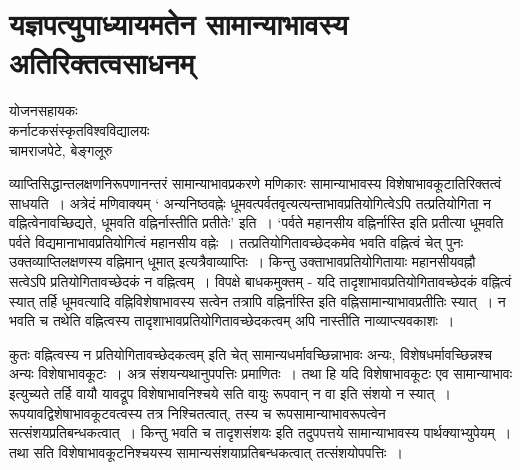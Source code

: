 {\fontsize{15}{17}\selectfont
\chapter{यज्ञपत्युपाध्यायमतेन सामान्याभावस्य अतिरिक्तत्वसाधनम्}

\begin{center}
\smallskip

योजनसहायकः\\
कर्नाटकसंस्कृतविश्वविद्यालयः\\
चामराजपेटे, बेङ्गलूरु
\addrule
\end{center}

व्याप्तिसिद्धान्तलक्षणनिरूपणानन्तरं सामान्याभावप्रकरणे मणिकारः  सामान्याभावस्य विशेषाभावकूटातिरिक्तत्वं साधयति~। अत्रेदं मणिवाक्यम् ‘ अन्यनिष्ठवह्नेः धूमवत्पर्वतवृत्यत्यन्ताभावप्रतियोगित्वेऽपि तत्प्रतियोगिता न वह्नित्वेनावच्छिद्यते, धूमवति वह्निर्नास्तीति प्रतीतेः’ इति~। ‘पर्वते महानसीय वह्निर्नास्ति इति प्रतीत्या धूमवति पर्वते विद्यमानाभावप्रतियोगित्वं महानसीय वह्नेः~। तत्प्रतियोगितावच्छेदकमेव भवति वह्नित्वं चेत् पुनः उक्तव्याप्तिलक्षणस्य वह्निमान् धूमात् इत्यत्रैवाव्याप्तिः~। किन्तु उक्ताभावप्रतियोगितायाः महानसीयवह्नौ सत्वेऽपि प्रतियोगितावच्छेदकं न वह्नित्वम्~। विपक्षे बाधकमुक्तम् - यदि तादृशाभावप्रतियोगितावच्छेदकं वह्नित्वं स्यात् तर्हि धूमवत्यादि वह्निविशेषाभावस्य सत्वेन तत्रापि वह्निर्नास्ति इति वह्निसामान्याभावप्रतीतिः स्यात्~। न भवति च तथेति वह्नित्वस्य तादृशाभावप्रतियोगितावच्छेदकत्वम् अपि नास्तीति नाव्याप्त्यवकाशः~।  

कुतः वह्नित्वस्य न प्रतियोगितावच्छेदकत्वम् इति चेत् सामान्यधर्मावच्छिन्नाभावः अन्यः, विशेषधर्मावच्छिन्नश्च अन्यः विशेषाभावकूटः~। अत्र संशयन्यथानुपपत्तिः प्रमाणितः~। तथा हि यदि विशेषाभावकूटः एव सामान्याभावः इत्युच्यते तर्हि वायौ यावद्रूप विशेषाभावनिश्चये सति वायुः रूपवान् न वा इति संशयो न स्यात्~। रूपयावद्विशेषाभावकूटवत्वस्य तत्र निश्चितत्वात्, तस्य च रूपसामान्याभावरूपत्वेन सत्संशयप्रतिबन्धकत्वात्~। किन्तु भवति च तादृशसंशयः इति तदुपपत्तये सामान्याभावस्य पार्थक्याभ्युपेयम्~। तथा सति विशेषाभावकूटनिश्चयस्य सामान्यसंशयाप्रतिबन्धकत्वात् तत्संशयोपपत्तिः~। 

}
